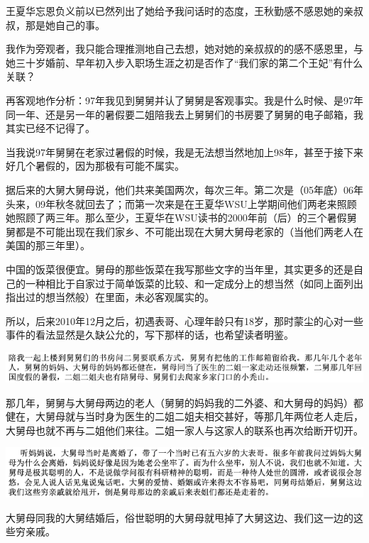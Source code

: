 \documentclass[9pt, b5paper]{article}
\begin{document}
王夏华忘恩负义前以已然列出了她给予我问话时的态度，王秋勤感不感恩她的亲叔叔，那是她自己的事。

我作为旁观者，我只能合理推测地自己去想，她对她的亲叔叔的的感不感恩里，与她三十岁婚前、早年初入步入职场生涯之初是否作了“我们家的第二个王妃”有什么关联？

再客观地作分析：97年我见到舅舅并认了舅舅是客观事实。我是什么时候、是97年同一年、还是另一年的暑假要二姐陪我去上舅舅们的书房要了舅舅的电子邮箱，我其实已经不记得了。

当我说97年舅舅在老家过暑假的时候，我是无法想当然地加上98年，甚至于接下来好几个暑假的，因为那极有可能不属实。

据后来的大舅大舅母说，他们共来美国两次，每次三年。第二次是（05年底）06年头来，09年秋冬就回去了；而第一次来是在王夏华WSU上学期间他们两老来照顾她照顾了两三年。那么至少，王夏华在WSU读书的2000年前（后）的三个暑假舅舅都是不可能出现在我们家乡、不可能出现在大舅大舅母老家的（当他们两老人在美国的那三年里）。 

中国的饭菜很便宜。舅母的那些饭菜在我写那些文字的当年里，其实更多的还是自己的一种相比于自家过于简单饭菜的比较、和一定成分上的想当然（如同上面列出指出过的想当然般）在里面，未必客观属实的。 

所以，后来2010年12月之后，初遇表哥、心理年龄只有18岁，那时蒙尘的心对一些事件的看法显然是久缺公允的，写下那样的话，也希望读者明鉴。 

\begin{center}
\includegraphics[width=.9\linewidth]{./pic/p1p25-2.png}
\end{center}

那几年，舅舅与大舅母两边的老人（舅舅的妈妈我的二外婆、和大舅母的妈妈）都健在，大舅母就与当时身为医生的二姐二姐夫相交甚好，等那几年两位老人走后，大舅母也就不再与二姐他们来往。二姐一家人与这家人的联系也再次给断开切开。 

\begin{center}
\includegraphics[width=.9\linewidth]{./pic/p1p92-1.png}
\end{center}

大舅母同我的大舅结婚后，俗世聪明的大舅母就甩掉了大舅这边、我们这一边的这些穷亲戚。
\end{document}
